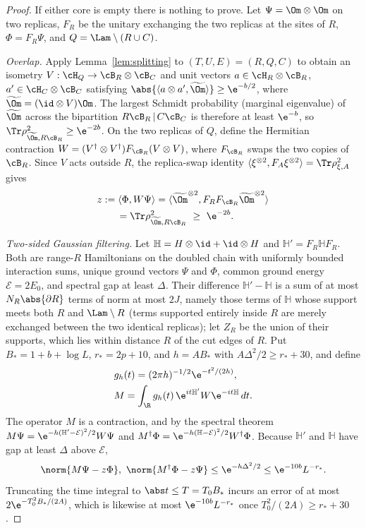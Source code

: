\begin{proof}
If either core is empty there is nothing to prove. Let $\Psi=\Om\otimes\Om$ on
two replicas, $F_R$ be the unitary exchanging the two replicas at the sites
of $R$, $\Phi=F_R\Psi$, and $Q=\Lam\setminus(R\cup C)$.

\emph{Overlap.} Apply Lemma~\ref{lem:splitting} to $(T,U,E)=(R,Q,C)$ to obtain an
isometry $V:\cH_Q\to\cB_R\otimes\cB_C$ and unit vectors $a\in\cH_R\otimes\cB_R$,
$a'\in\cH_C\otimes\cB_C$ satisfying
$\abs{\langle a\otimes a',\widetilde\Om\rangle}\ge\e^{-b/2}$, where
$\widetilde\Om=(\id\otimes V)\Om$. The largest Schmidt probability (marginal eigenvalue) of
$\widetilde\Om$ across the bipartition $R\cB_R\,|\,C\cB_C$ is therefore at least $\e^{-b}$,
so $\Tr\rho_{\widetilde\Om,R\cB_R}^2\ge\e^{-2b}$. On the two
replicas of $Q$, define the Hermitian contraction
$W=(V^\dagger\otimes V^\dagger)F_{\cB_R}(V\otimes V)$, where $F_{\cB_R}$ swaps
the two copies of $\cB_R$. Since $V$ acts outside $R$, the replica-swap identity
$\langle\xi^{\otimes2},F_{A}\xi^{\otimes2}\rangle=\Tr\rho_{\xi,A}^2$ gives
\begin{equation}\label{eq:zoverlap}
\begin{split}
 &z:=\langle\Phi,W\Psi\rangle=\langle\widetilde\Om^{\otimes2},F_RF_{\cB_R}\widetilde\Om^{\otimes2}\rangle\\
 &\qquad=\Tr\rho_{\widetilde\Om,R\cB_R}^2\ \ge\ \e^{-2b}.
\end{split}
\end{equation}

\emph{Two-sided Gaussian filtering.} Let $\mathbb H=H\otimes\id+\id\otimes H$
and $\mathbb H'=F_R\mathbb HF_R$. Both are range-$R$ Hamiltonians on the
doubled chain with uniformly bounded interaction sums, unique ground
vectors $\Psi$ and $\Phi$, common ground energy $\mathcal E=2E_0$, and spectral gap at
least $\Delta$. Their difference $\mathbb H'-\mathbb H$ is a sum of at most $N_R\abs{\partial R}$
terms of norm at most $2J$, namely those terms of $\mathbb H$ whose support meets both $R$
and $\Lam\setminus R$ (terms supported entirely inside $R$ are merely exchanged between the
two identical replicas); let $Z_R$ be the union of their supports, which lies
within distance $R$ of the cut edges of $R$. Put
$B_*=1+b+\log L$, $r_*=2p+10$, and $h=AB_*$ with $A\Delta^2/2\ge r_*+30$, and define
\[
\begin{split}
 &g_h(t)=(2\pi h)^{-1/2}\e^{-t^2/(2h)},\\
 &M=\int_{\R}g_h(t)\,\e^{it\mathbb H'}W\e^{-it\mathbb H}\,dt .
\end{split}
\]
The operator $M$ is a contraction, and by the spectral theorem
$M\Psi=\e^{-h(\mathbb H'-\mathcal E)^2/2}W\Psi$ and $M^\dagger\Phi=\e^{-h(\mathbb H-\mathcal E)^2/2}W^\dagger\Phi$.
Because $\mathbb H'$ and $\mathbb H$ have gap at least $\Delta$ above $\mathcal E$,
\begin{equation}\label{eq:twosided}
 \norm{M\Psi-z\Phi},\ \norm{M^\dagger\Phi-z\Psi}\le\e^{-h\Delta^2/2}\le\e^{-10b}L^{-r_*}.
\end{equation}
Truncating the time integral to $\abs t\le T=T_0B_*$ incurs an error of at most
$2\e^{-T_0^2B_*/(2A)}$, which is likewise at most $\e^{-10b}L^{-r_*}$ once
$T_0^2/(2A)\ge r_*+30$.


\end{proof}
